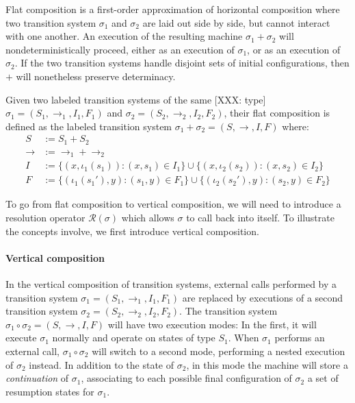 \documentclass[sigplan,10pt,review,anonymous]{acmart}
\begin{document}
Flat composition
is a first-order approximation of horizontal composition
where two transition system $\sigma_1$ and $\sigma_2$
are laid out side by side,
but cannot interact with one another.
An execution of the resulting machine $\sigma_1 + \sigma_2$
will nondeterministically proceed,
either as an execution of $\sigma_1$,
or as an execution of $\sigma_2$.
If the two transition systems
handle disjoint sets of initial configurations,
then $+$ will nonetheless preserve determinacy.

\begin{definition}
Given two labeled transition systems of the same [XXX: type]
$\sigma_1 = (S_1, \rightarrow_1, I_1, F_1)$ and
$\sigma_2 = (S_2, \rightarrow_2, I_2, F_2)$,
their flat composition is defined as
the labeled transition system
$\sigma_1 + \sigma_2 = (S, \rightarrow, I, F)$
where:
\begin{align*}
  S &:= S_1 + S_2 \\
  {\rightarrow} &:= {\rightarrow_1} + {\rightarrow_2} \\
  I &:= \{ (x, \iota_1(s_1)) : (x, s_1) \in I_1 \}
   \cup \{ (x, \iota_2(s_2)) : (x, s_2) \in I_2 \} \\
  F &:= \{ (\iota_1(s_1'), y) : (s_1, y) \in F_1 \}
   \cup \{ (\iota_2(s_2'), y) : (s_2, y) \in F_2 \}
\end{align*}
\end{definition}

To go from flat composition to vertical composition,
we will need to introduce a resolution operator $\mathcal{R}(\sigma)$
which allows $\sigma$ to call back into itself.
To illustrate the concepts involve,
we first introduce vertical composition.


\paragraph{Vertical composition} %

In the vertical composition of transition systems,
external calls performed by a transition system
$\sigma_1 = (S_1, \rightarrow_1, I_1, F_1)$
are replaced by executions of a second transition system
$\sigma_2 = (S_2, \rightarrow_2, I_2, F_2)$.
The transition system
$\sigma_1 \circ \sigma_2 = (S, \rightarrow, I, F)$
will have two execution modes:
In the first,
it will execute $\sigma_1$ normally and
operate on states of type $S_1$.
When $\sigma_1$ performs an external call,
$\sigma_1 \circ \sigma_2$ will switch to a second mode,
performing a nested execution of $\sigma_2$ instead.
In addition to the state of $\sigma_2$,
in this mode the machine will store a \emph{continuation} of $\sigma_1$,
associating to each possible final configuration of $\sigma_2$
a set of resumption states for $\sigma_1$.
\end{document}
